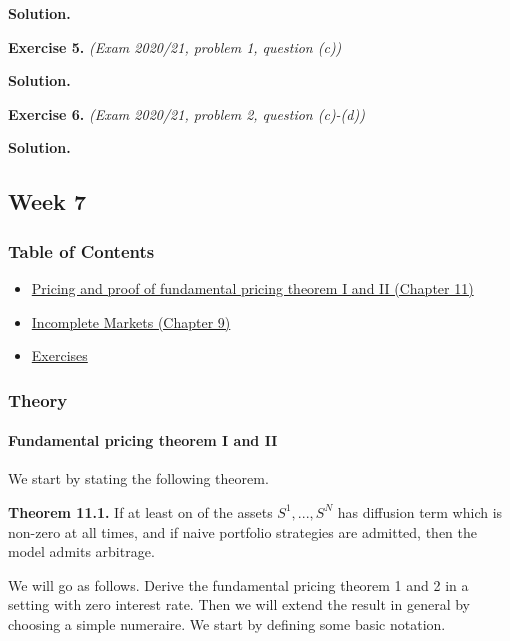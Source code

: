 \documentclass[
]{article}
\begin{document}
\textbf{Solution.}

\textbf{Exercise 5.} \emph{(Exam 2020/21, problem 1, question (c))}

\textbf{Solution.}

\textbf{Exercise 6.} \emph{(Exam 2020/21, problem 2, question (c)-(d))}

\textbf{Solution.}

\hypertarget{week-7}{%
\subsection{Week 7}\label{week-7}}

\hypertarget{table-of-contents-6}{%
\subsubsection{Table of Contents}\label{table-of-contents-6}}

\begin{itemize}
\item
  \protect\hyperlink{fundamental-pricing-theorem-i-and-ii}{Pricing and
  proof of fundamental pricing theorem I and II (Chapter 11)}
\item
  \protect\hyperlink{incomplete-markets}{Incomplete Markets (Chapter 9)}
\item
  \protect\hyperlink{exercises-week-7}{Exercises}
\end{itemize}

\hypertarget{theory-6}{%
\subsubsection{Theory}\label{theory-6}}

\hypertarget{fundamental-pricing-theorem-i-and-ii}{%
\paragraph{Fundamental pricing theorem I and
II}\label{fundamental-pricing-theorem-i-and-ii}}

We start by stating the following theorem.

\textbf{Theorem 11.1.} If at least on of the assets \(S^1,...,S^N\) has
diffusion term which is non-zero at all times, and if naive portfolio
strategies are admitted, then the model admits arbitrage.

We will go as follows. Derive the fundamental pricing theorem 1 and 2 in
a setting with zero interest rate. Then we will extend the result in
general by choosing a simple numeraire. We start by defining some basic
notation.
\end{document}
